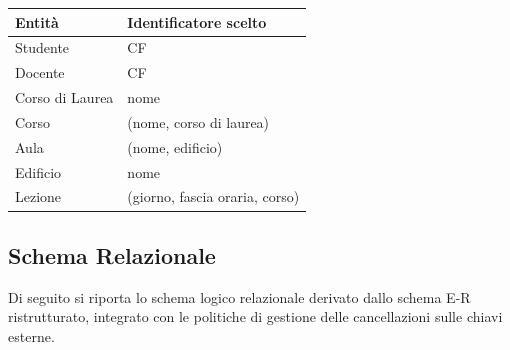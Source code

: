 \documentclass[a4paper,11pt]{article}
\begin{document}
\begin{table}[H]
    \centering
    \begin{tabular}{l l}
    \toprule
    \textbf{Entità} & \textbf{Identificatore scelto} \\
    \midrule
    Studente & CF \\
    Docente & CF \\
    Corso di Laurea & nome \\
    Corso & (nome, corso di laurea) \\
    Aula & (nome, edificio) \\
    Edificio & nome \\
    Lezione & (giorno, fascia oraria, corso) \\
    \bottomrule
    \end{tabular}
\end{table}


\subsection{Schema Relazionale}
\label{sec:logical_schema}

Di seguito si riporta lo schema logico relazionale derivato dallo schema E-R ristrutturato, integrato con le politiche di gestione delle cancellazioni sulle chiavi esterne.
\end{document}
